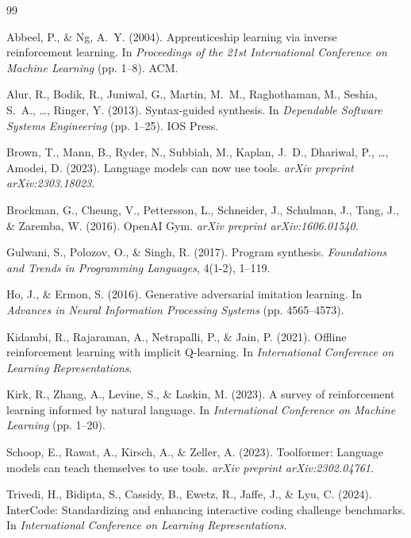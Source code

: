 \documentclass[11pt,a4paper]{article}
\begin{document}

\begin{thebibliography}{99}

Abbeel, P., \& Ng, A.~Y. (2004). Apprenticeship learning via inverse reinforcement learning. In \textit{Proceedings of the 21st International Conference on Machine Learning} (pp. 1--8). ACM.

Alur, R., Bodik, R., Juniwal, G., Martin, M.~M., Raghothaman, M., Seshia, S.~A., \ldots, Ringer, Y. (2013). Syntax-guided synthesis. In \textit{Dependable Software Systems Engineering} (pp. 1--25). IOS Press.

Brown, T., Mann, B., Ryder, N., Subbiah, M., Kaplan, J.~D., Dhariwal, P., \ldots, Amodei, D. (2023). Language models can now use tools. \textit{arXiv preprint arXiv:2303.18023}.

Brockman, G., Cheung, V., Pettersson, L., Schneider, J., Schulman, J., Tang, J., \& Zaremba, W. (2016). OpenAI Gym. \textit{arXiv preprint arXiv:1606.01540}.

Gulwani, S., Polozov, O., \& Singh, R. (2017). Program synthesis. \textit{Foundations and Trends in Programming Languages}, 4(1-2), 1--119.

Ho, J., \& Ermon, S. (2016). Generative adversarial imitation learning. In \textit{Advances in Neural Information Processing Systems} (pp. 4565--4573).

Kidambi, R., Rajaraman, A., Netrapalli, P., \& Jain, P. (2021). Offline reinforcement learning with implicit Q-learning. In \textit{International Conference on Learning Representations}.

Kirk, R., Zhang, A., Levine, S., \& Laskin, M. (2023). A survey of reinforcement learning informed by natural language. In \textit{International Conference on Machine Learning} (pp. 1--20).

Schoop, E., Rawat, A., Kirsch, A., \& Zeller, A. (2023). Toolformer: Language models can teach themselves to use tools. \textit{arXiv preprint arXiv:2302.04761}.

Trivedi, H., Bidipta, S., Cassidy, B., Ewetz, R., Jaffe, J., \& Lyu, C. (2024). InterCode: Standardizing and enhancing interactive coding challenge benchmarks. In \textit{International Conference on Learning Representations}.

\end{thebibliography}
\end{document}
